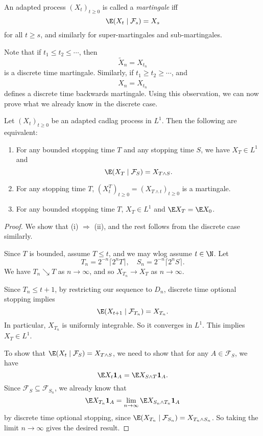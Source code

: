 \documentclass[a4paper]{article}
\begin{document}
\begin{defi}
  An adapted process $(X_t)_{t \geq 0}$ is called a \emph{martingale} iff
  \[
    \E (X_t \mid \mathcal{F}_s) = X_s
  \]
  for all $t \geq s$, and similarly for super-martingales and sub-martingales.
\end{defi}

Note that if $t_1 \leq t_2 \leq \cdots$, then
\[
  \tilde{X}_n = X_{t_n}
\]
is a discrete time martingale. Similarly, if $t_1 \geq t_2 \geq \cdots$, and
\[
  \hat{X}_n = X_{t_n}
\]
defines a discrete time backwards martingale. Using this observation, we can now prove what we already know in the discrete case.

\begin{thm}
  Let $(X_t)_{t \geq 0}$ be an adapted cadlag process in $L^1$. Then the following are equivalent:
  \begin{enumerate}
    \item For any bounded stopping time $T$ and any stopping time $S$, we have $X_T \in L^1$ and
      \[
        \E(X_T \mid \mathcal{F}_S) = X_{T \wedge S}.
      \]
    \item For any stopping time $T$, $(X_t^T)_{t \geq 0} = (X_{T \wedge t})_{t \geq 0}$ is a martingale.
    \item For any bounded stopping time $T$, $X_T \in L^1$ and $\E X_T = \E X_0$.
  \end{enumerate}
\end{thm}

\begin{proof}
  We show that (i) $\Rightarrow$ (ii), and the rest follows from the discrete case similarly.

  Since $T$ is bounded, assume $T \leq t$, and we may wlog assume $t \in \N$. Let
  \[
    T_n = 2^{-n} \lceil 2^n T\rceil,\quad S_n = 2^{-n} \lceil 2^n S\rceil.
  \]
  We have $T_n \searrow T$ as $n \to \infty$, and so $X_{T_n} \to X_T$ as $n \to \infty$.

  Since $T_n \leq t + 1$, by restricting our sequence to $D_n$, discrete time optional stopping implies
  \[
    \E (X_{t + 1} \mid \mathcal{F}_{T_n}) = X_{T_n}.
  \]
  In particular, $X_{T_n}$ is uniformly integrable. So it converges in $L^1$. This implies $X_T \in L^1$.

  To show that $\E(X_t \mid \mathcal{F}_S) = X_{T \wedge S}$, we need to show that for any $A \in \mathcal{F}_S$, we have
  \[
    \E X_t \mathbf{1}_A = \E X_{S \wedge T} \mathbf{1}_A.
  \]
  Since $\mathcal{F}_S \subseteq \mathcal{F}_{S_n}$, we already know that
  \[
    \E X_{T_n} \mathbf{1}_A = \lim_{n \to \infty} \E X_{S_n \wedge T_n} \mathbf{1}_A
  \]
  by discrete time optional stopping, since $\E (X_{T_n} \mid \mathcal{F}_{S_n}) = X_{T_n \wedge S_n}$. So taking the limit $n \to \infty$ gives the desired result.
\end{proof}
\end{document}
